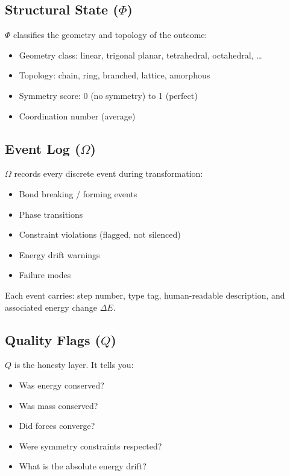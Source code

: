 \documentclass[11pt]{article}
\begin{document}
\subsection{Structural State ($\Phi$)}

$\Phi$ classifies the geometry and topology of the outcome:
\begin{itemize}
  \item Geometry class: linear, trigonal planar, tetrahedral, octahedral, \ldots
  \item Topology: chain, ring, branched, lattice, amorphous
  \item Symmetry score: 0 (no symmetry) to 1 (perfect)
  \item Coordination number (average)
\end{itemize}

\subsection{Event Log ($\Omega$)}

$\Omega$ records every discrete event during transformation:
\begin{itemize}
  \item Bond breaking / forming events
  \item Phase transitions
  \item Constraint violations (flagged, not silenced)
  \item Energy drift warnings
  \item Failure modes
\end{itemize}

Each event carries: step number, type tag, human-readable description, and associated energy change $\Delta E$.

\subsection{Quality Flags ($Q$)}

$Q$ is the honesty layer. It tells you:
\begin{itemize}
  \item Was energy conserved?
  \item Was mass conserved?
  \item Did forces converge?
  \item Were symmetry constraints respected?
  \item What is the absolute energy drift?
\end{itemize}
\end{document}
